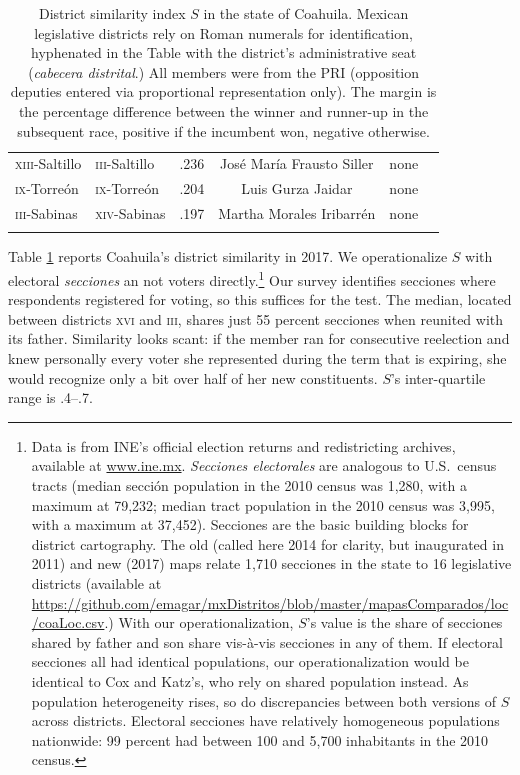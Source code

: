 \documentclass[letter,12pt]{article}
\begin{document}
\begin{table}
{\begin{tabular}{llrccc}
 \textsc{xiii}-Saltillo     & \textsc{iii}-Saltillo       &  .236 & José María Frausto Siller   & none            & \\ 
 \textsc{ix}-Torreón        & \textsc{ix}-Torreón         &  .204 & Luis Gurza Jaidar           & none            & \\ 
 \textsc{iii}-Sabinas       & \textsc{xiv}-Sabinas        &  .197 & Martha Morales Iribarrén    & none            & \\ 
 \\ [-1.2ex] \hline
\end{tabular}
}
\caption{District similarity index $S$ in the state of Coahuila. Mexican legislative districts rely on Roman numerals for identification, hyphenated in the Table with the district's administrative seat (\emph{cabecera distrital}.) All members were from the PRI (opposition deputies entered via proportional representation only). The margin is the percentage difference between the winner and runner-up in the subsequent race, positive if the incumbent won, negative otherwise.}\label{T:dsi}
\end{table}

Table \ref{T:dsi} reports Coahuila's district similarity in 2017. We operationalize $S$ with electoral \emph{secciones} an not voters directly.\footnote{Data is from INE's official election returns and redistricting archives, available at \url{www.ine.mx}. \emph{Secciones electorales} are analogous to U.S.\ census tracts (median sección population in the 2010 census was 1,280, with a maximum at 79,232; median tract population in the 2010 census was 3,995, with a maximum at 37,452). Secciones are the basic building blocks for district cartography. The old (called here 2014 for clarity, but inaugurated in 2011) and new (2017) maps relate 1,710 secciones in the state to 16 legislative districts (available at \url{https://github.com/emagar/mxDistritos/blob/master/mapasComparados/loc/coaLoc.csv}.) With our operationalization, $S$'s value is the share of secciones shared by father and son share vis-à-vis secciones in any of them. If electoral secciones all had identical populations, our operationalization would be identical to Cox and Katz's, who rely on shared population instead. As population heterogeneity rises, so do discrepancies between both versions of $S$ across districts. Electoral secciones have relatively homogeneous populations nationwide: 99 percent had between 100 and 5,700 inhabitants in the 2010 census.} Our survey identifies secciones where respondents registered for voting, so this suffices for the test. The median, located between districts \textsc{xvi} and \textsc{iii}, shares just 55 percent secciones when reunited with its father. Similarity looks scant: if the member ran for consecutive reelection and knew personally every voter she represented during the term that is expiring, she would recognize only a bit over half of her new constituents. $S$'s inter-quartile range is .4--.7.
\end{document}
